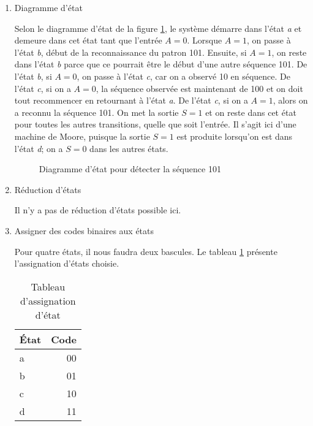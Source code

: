 \documentclass[11pt]{article}
\begin{document}
\begin{enumerate}
\item Diagramme d'état
\label{sec:orgc71b528}

Selon le diagramme d'état de la figure \ref{fig:org84a70d0}, le
système démarre dans l'état \emph{a} et demeure dans cet état tant que
l'entrée \(A=0\). Lorsque \(A=1\), on passe à l'état \emph{b}, début de la
reconnaissance du patron 101. Ensuite, si \(A=1\), on reste dans
l'état \emph{b} parce que ce pourrait être le début d'une autre
séquence 101. De l'état \emph{b}, si \(A=0\), on passe à l'état \emph{c}, car on
a observé 10 en séquence. De l'état \emph{c}, si on a \(A=0\), la séquence
observée est maintenant de 100 et on doit tout recommencer en
retournant à l'état \emph{a}.  De l'état \emph{c}, si on a \(A=1\), alors on a
reconnu la séquence 101. On met la sortie \(S=1\) et on reste dans cet
état pour toutes les autres transitions, quelle que soit l'entrée. Il
s'agit ici d'une machine de Moore, puisque la sortie \(S=1\) est
produite lorsqu'on est dans l'état \emph{d}; on a \(S=0\) dans les autres
états.

\begin{figure}[htbp]
\centering

\caption{\label{fig:org84a70d0}Diagramme d'état pour détecter la séquence 101}
\end{figure}


\item Réduction d'états
\label{sec:orgf914906}

Il n'y a pas de réduction d'états possible ici.

\item Assigner des codes binaires aux états
\label{sec:orgab8100f}

Pour quatre états, il nous faudra deux bascules.  Le tableau
   \ref{tab:org701cdbe} présente l'assignation d'états choisie.

\begin{table}[htbp]
\caption{\label{tab:org701cdbe}Tableau d'assignation d'état}
\centering
\begin{tabular}{lr}
État & Code\\[0pt]
\hline
a & 00\\[0pt]
b & 01\\[0pt]
c & 10\\[0pt]
d & 11\\[0pt]
\end{tabular}
\end{table}



\end{enumerate}
\end{document}
